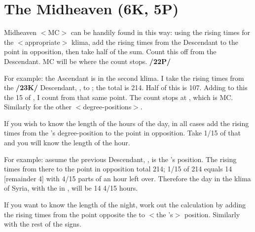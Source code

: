 \section{The Midheaven (6K, 5P)}

Midheaven $<$MC$>$ can be handily found in this way: using the rising times for the $<$appropriate$>$ klima, add the rising times from the Descendant to the point in opposition, then take half of the sum.
Count this off from the Descendant. MC will be where the count stops. \textbf{/22P/} 

For example: the Ascendant is \Capricorn\xspace 15\deg\xspace in the second klima. I take the rising times from the \textbf{/23K/} Descendant, \Cancer\xspace 15\deg, to \Capricorn\xspace 15\deg; the total is 214. Half of this is 107. Adding to this the 15\deg\xspace of \Cancer, I count from that same point. The count stops at \Scorpio\xspace 2\deg, which is MC. Similarly for the other $<$degree-positions$>$.

If you wish to know the length of the hours of the day, in all cases add the rising times from the \Sun’s degree-position to the point in opposition. Take 1/15 of that and you will know the length of the hour.

For example: assume the previous Descendant, \Cancer\xspace 15\deg, is the \Sun’s position. The rising times from there to the point in opposition total 214; 1/15 of 214 equals 14 [remainder 4] with 4/15 parts of an hour left over. Therefore the day in the klima of Syria, with the \Sun\xspace in \Cancer\xspace 15\deg, will be 14 4/15 hours. 

If you want to know the length of the night, work out the calculation by adding the rising times from the point opposite the \Sun\xspace to $<$the \Sun’s$>$ position. Similarly with the rest of the signs.

\newpage